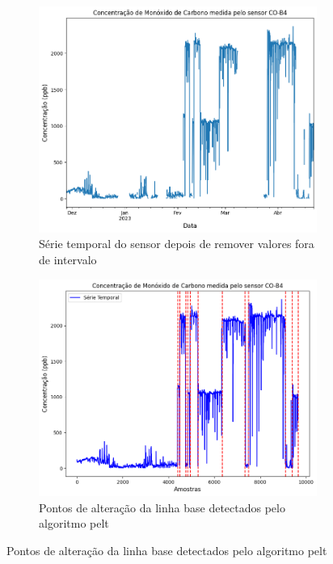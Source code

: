 \begin{figure}[h]
    \centering
    \caption{Série temporal do sensor CO-B4}
    \begin{subfigure}{0.495\textwidth}
        \includegraphics[width=\textwidth]{chapters/3-RESULTADOS CAMPO/Figuras/raw-co-b4.png}
        \caption{Série temporal do sensor depois de remover valores fora de intervalo}
        \label{fig:data-co-raw}
    \end{subfigure}
    \hfill
    \begin{subfigure}{0.495\textwidth}
        \includegraphics[width=\textwidth]{chapters/3-RESULTADOS CAMPO/Figuras/rebase-co-b4.png}
        \caption{Pontos de alteração da linha base detectados pelo algoritmo \acrshort{pelt}}
        \label{fig:data-rebase-co}
    \end{subfigure}
    \hfill
    \label{fig:data-co-raw-and-pelt}
\end{figure}

